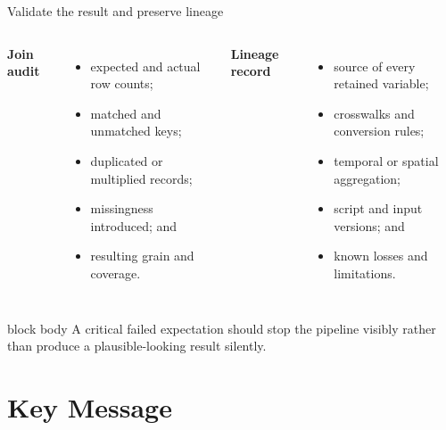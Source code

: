 \documentclass[10pt,aspectratio=169]{beamer}
\begin{document}
\begin{frame}{Validate the result and preserve lineage}

\small

\begin{columns}[T]


\textbf{Join audit}

\begin{itemize}
  \item expected and actual row counts;
  \item matched and unmatched keys;
  \item duplicated or multiplied records;
  \item missingness introduced; and
  \item resulting grain and coverage.
\end{itemize}


\textbf{Lineage record}

\begin{itemize}
  \item source of every retained variable;
  \item crosswalks and conversion rules;
  \item temporal or spatial aggregation;
  \item script and input versions; and
  \item known losses and limitations.
\end{itemize}

\end{columns}

\vspace{0.35cm}

\begin{beamercolorbox}[rounded=true,sep=8pt]{block body}
A critical failed expectation should stop the pipeline visibly rather than produce a plausible-looking result silently.
\end{beamercolorbox}

\end{frame}



\section{Key Message}
\end{document}
